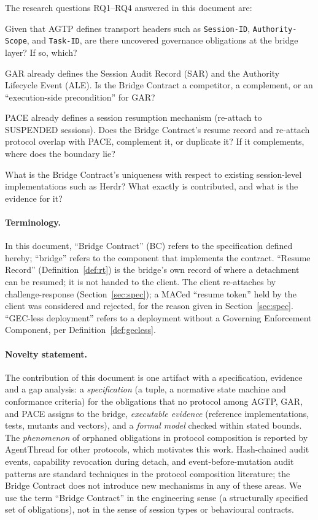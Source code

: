 The research questions RQ1--RQ4 answered in this document are:

\begin{description}[leftmargin=2em]
\item[RQ1] Given that AGTP defines transport headers such as
\texttt{Session-ID}, \texttt{Authority-Scope}, and \texttt{Task-ID}, are
there uncovered governance obligations at the bridge layer? If so, which?
\item[RQ2] GAR already defines the Session Audit Record (SAR) and the
Authority Lifecycle Event (ALE). Is the Bridge Contract a competitor, a
complement, or an ``execution-side precondition'' for GAR?
\item[RQ3] PACE already defines a session resumption mechanism (re-attach
to SUSPENDED sessions). Does the Bridge Contract's resume record and re-attach protocol
overlap with PACE, complement it, or duplicate it? If it complements, where
does the boundary lie?
\item[RQ4] What is the Bridge Contract's uniqueness with respect to
existing session-level implementations such as Herdr? What exactly is
contributed, and what is the evidence for it?
\end{description}

\paragraph{Terminology.} In this document, ``Bridge Contract'' (BC) refers to
the specification defined hereby; ``bridge'' refers to the component that
implements the contract. ``Resume Record'' (Definition~\ref{def:rt})
is the bridge's own record of where a detachment can be resumed; it is
not handed to the client. The client re-attaches by challenge-response
(Section~\ref{sec:spec}); a MACed ``resume token'' held by the client
was considered and rejected, for the reason given in
Section~\ref{sec:spec}.
``GEC-less deployment'' refers to a deployment without
a Governing Enforcement Component, per Definition~\ref{def:gecless}.

\paragraph{Novelty statement.} The contribution of this document is one
artifact with a specification, evidence and a gap analysis: a \emph{specification} (a tuple, a normative
state machine and conformance criteria) for the obligations that no
protocol among AGTP, GAR, and PACE assigns to the bridge, \emph{executable
evidence} (reference implementations, tests, mutants and vectors), and a
\emph{formal model} checked within stated bounds. The \emph{phenomenon} of orphaned obligations in
protocol composition is reported by AgentThread
\cite{zheng2026formal} for other protocols, which motivates this work. Hash-chained
audit events, capability revocation during detach, and event-before-mutation
audit patterns are standard techniques in the protocol composition
literature; the Bridge Contract does not introduce new mechanisms in any
of these areas. We use the term ``Bridge Contract'' in the engineering
sense (a structurally specified set of obligations), not in the sense of
session types or behavioural contracts.

